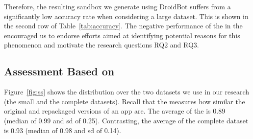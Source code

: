 



Therefore, the resulting sandbox we generate using
DroidBot suffers from a significantly low accuracy rate when considering a
large dataset.
This is shown in the second row of Table~\ref{tab:accuracy}.
The negative performance of the \mas in the \cds encouraged us to endorse efforts aimed at identifying potential reasons for
this phenomenon and motivate the research questions RQ2 and RQ3. 



\subsection{Assessment Based on \sscore}

Figure~\ref{fig:ss} shows the \sscore distribution
over the two datasets we use in our research
(the small and the complete datasets).
Recall that the \sscore measures how similar the
original and repackaged versions of an app are.
The average \sscore of the
\sds is 0.89 (median of 0.99 and sd of 0.25). Contrasting,
the average \sscore of the complete dataset is
0.93 (median of 0.98 and sd of 0.14).

